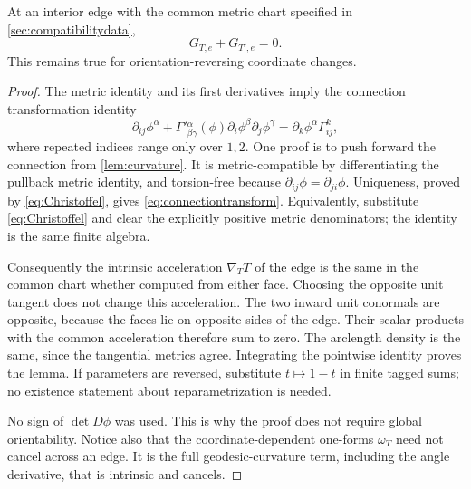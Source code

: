 \begin{lemma}\label{lem:seam}
At an interior edge with the common metric chart specified in \cref{sec:compatibilitydata},
\[
G_{T,e}+G_{T',e}=0.
\]
This remains true for orientation-reversing coordinate changes.
\end{lemma}
\begin{proof}
The metric identity and its first derivatives imply the connection transformation identity
\begin{equation}\label{eq:connectiontransform}
\partial_{ij}\phi^\alpha+
\Gamma'{}^\alpha_{\beta\gamma}(\phi)
\partial_i\phi^\beta\partial_j\phi^\gamma
=\partial_k\phi^\alpha\Gamma^k_{ij},
\end{equation}
where repeated indices range only over $1,2$. One proof is to push forward the connection from \cref{lem:curvature}. It is metric-compatible by differentiating the pullback metric identity, and torsion-free because $\partial_{ij}\phi=\partial_{ji}\phi$. Uniqueness, proved by \eqref{eq:Christoffel}, gives \eqref{eq:connectiontransform}. Equivalently, substitute \eqref{eq:Christoffel} and clear the explicitly positive metric denominators; the identity is the same finite algebra.

Consequently the intrinsic acceleration $\nabla_TT$ of the edge is the same in the common chart whether computed from either face. Choosing the opposite unit tangent does not change this acceleration. The two inward unit conormals are opposite, because the faces lie on opposite sides of the edge. Their scalar products with the common acceleration therefore sum to zero. The arclength density is the same, since the tangential metrics agree. Integrating the pointwise identity proves the lemma. If parameters are reversed, substitute $t\mapsto1-t$ in finite tagged sums; no existence statement about reparametrization is needed.

No sign of $\det D\phi$ was used. This is why the proof does not require global orientability. Notice also that the coordinate-dependent one-forms $\omega_T$ need not cancel across an edge. It is the full geodesic-curvature term, including the angle derivative, that is intrinsic and cancels.
\end{proof}

